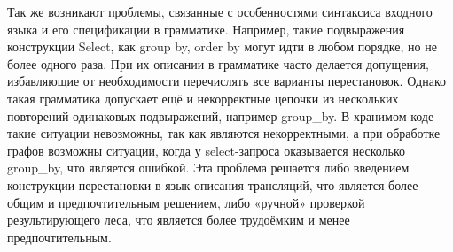 \documentclass[a5paper]{article}
\begin{document}
Так же возникают проблемы, связанные с особенностями синтаксиса входного языка и его спецификации в грамматике. Например, такие подвыражения конструкции Select, как group by, order by могут идти в любом порядке, но не более одного раза. При их описании в грамматике часто делается допущения, избавляющие от необходимости перечислять все варианты перестановок. Однако такая грамматика допускает ещё и некорректные цепочки из нескольких повторений одинаковых подвыражений, например group\_by. В хранимом коде такие ситуации невозможны, так как являются некорректными, а при обработке графов возможны ситуации, когда у select-запроса оказывается несколько group\_by, что является ошибкой. Эта проблема решается либо введением конструкции перестановки в язык описания трансляций, что является более общим и предпочтительным решением, либо «ручной» проверкой результирующего леса, что является более трудоёмким и менее предпочтительным.
\end{document}
